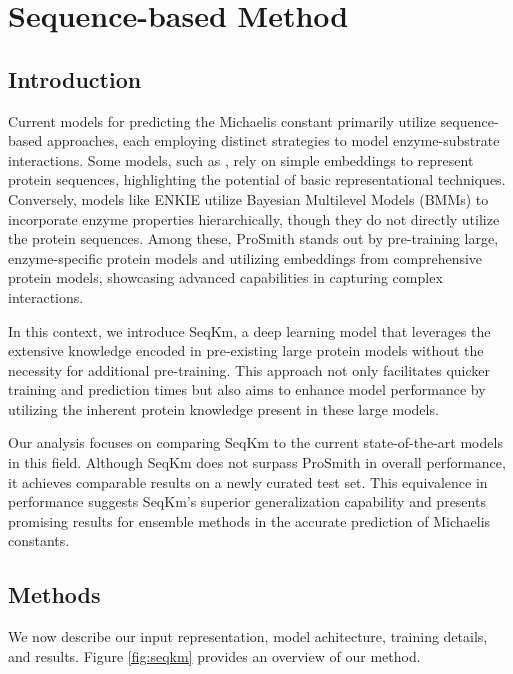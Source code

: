 
\chapter{Sequence-based Method}

\section{Introduction}

Current models for predicting the Michaelis constant primarily utilize sequence-based approaches, each employing distinct strategies to model enzyme-substrate interactions. Some models, such as \citeauthor{km1}, rely on simple embeddings to represent protein sequences, highlighting the potential of basic representational techniques. Conversely, models like ENKIE utilize Bayesian Multilevel Models (BMMs) to incorporate enzyme properties hierarchically, though they do not directly utilize the protein sequences. \cite{enkie} Among these, ProSmith stands out by pre-training large, enzyme-specific protein models and utilizing embeddings from comprehensive protein models, showcasing advanced capabilities in capturing complex interactions. \cite{prosmith}

In this context, we introduce SeqKm, a deep learning model that leverages the extensive knowledge encoded in pre-existing large protein models without the necessity for additional pre-training. This approach not only facilitates quicker training and prediction times but also aims to enhance model performance by utilizing the inherent protein knowledge present in these large models.

Our analysis focuses on comparing SeqKm to the current state-of-the-art models in this field. Although SeqKm does not surpass ProSmith in overall performance, it achieves comparable results on a newly curated test set. This equivalence in performance suggests SeqKm's superior generalization capability and presents promising results for ensemble methods in the accurate prediction of Michaelis constants.

\section{Methods}

We now describe our input representation, model achitecture, training details, and results. 
Figure \ref{fig:seqkm} provides an overview of our method.

